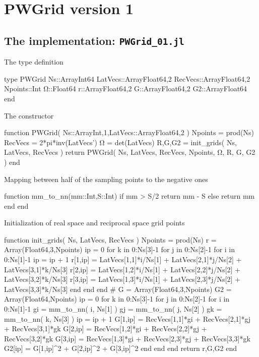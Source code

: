 \section{PWGrid version 1}

\subsection{The implementation: {\tt PWGrid\_01.jl}}

The type definition

\begin{juliacode}
type PWGrid
  Ns::Array{Int64}
  LatVecs::Array{Float64,2}
  RecVecs::Array{Float64,2}
  Npoints::Int
  Ω::Float64
  r::Array{Float64,2}
  G::Array{Float64,2}
  G2::Array{Float64}
end
\end{juliacode}


The constructor

\begin{juliacode}
function PWGrid( Ns::Array{Int,1},LatVecs::Array{Float64,2} )
  Npoints = prod(Ns)
  RecVecs = 2*pi*inv(LatVecs')
  Ω = det(LatVecs)
  R,G,G2 = init_grids( Ns, LatVecs, RecVecs )
  return PWGrid( Ns, LatVecs, RecVecs, Npoints, Ω, R, G, G2 )
end
\end{juliacode}


Mapping between half of the sampling points to the negative ones

\begin{juliacode}
function mm_to_nn(mm::Int,S::Int)
  if mm > S/2
    return mm - S
  else
    return mm
  end
end
\end{juliacode}

Initialization of real space and reciprocal space grid points

\begin{juliacode}
function init_grids( Ns, LatVecs, RecVecs )
  Npoints = prod(Ns)
  r = Array(Float64,3,Npoints)
  ip = 0
  for k in 0:Ns[3]-1
  for j in 0:Ns[2]-1
  for i in 0:Ns[1]-1
    ip = ip + 1
    r[1,ip] = LatVecs[1,1]*i/Ns[1] + LatVecs[2,1]*j/Ns[2] + LatVecs[3,1]*k/Ns[3]
    r[2,ip] = LatVecs[1,2]*i/Ns[1] + LatVecs[2,2]*j/Ns[2] + LatVecs[3,2]*k/Ns[3]
    r[3,ip] = LatVecs[1,3]*i/Ns[1] + LatVecs[2,3]*j/Ns[2] + LatVecs[3,3]*k/Ns[3]
  end
  end
  end
  #
  G  = Array(Float64,3,Npoints)
  G2 = Array(Float64,Npoints)
  ip    = 0
  for k in 0:Ns[3]-1
  for j in 0:Ns[2]-1
  for i in 0:Ns[1]-1
    gi = mm_to_nn( i, Ns[1] )
    gj = mm_to_nn( j, Ns[2] )
    gk = mm_to_nn( k, Ns[3] )
    ip = ip + 1
    G[1,ip] = RecVecs[1,1]*gi + RecVecs[2,1]*gj + RecVecs[3,1]*gk
    G[2,ip] = RecVecs[1,2]*gi + RecVecs[2,2]*gj + RecVecs[3,2]*gk
    G[3,ip] = RecVecs[1,3]*gi + RecVecs[2,3]*gj + RecVecs[3,3]*gk
    G2[ip] = G[1,ip]^2 + G[2,ip]^2 + G[3,ip]^2
  end
  end
  end
  return r,G,G2
end
\end{juliacode}

